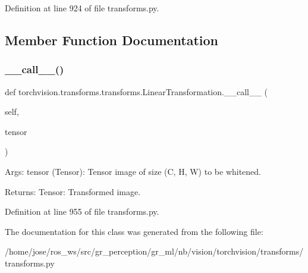 Definition at line 924 of file transforms.\+py.



\subsection{Member Function Documentation}
\mbox{\label{classtorchvision_1_1transforms_1_1transforms_1_1LinearTransformation_a9a29e7502fee078fcefed71fa7128657}} 
\subsubsection{\texorpdfstring{\+\_\+\+\_\+call\+\_\+\+\_\+()}{\_\_call\_\_()}}
{\footnotesize\ttfamily def torchvision.\+transforms.\+transforms.\+Linear\+Transformation.\+\_\+\+\_\+call\+\_\+\+\_\+ (\begin{DoxyParamCaption}\item[{}]{self,  }\item[{}]{tensor }\end{DoxyParamCaption})}

\begin{DoxyVerb}Args:
    tensor (Tensor): Tensor image of size (C, H, W) to be whitened.

Returns:
    Tensor: Transformed image.
\end{DoxyVerb}
 

Definition at line 955 of file transforms.\+py.



The documentation for this class was generated from the following file\+:\begin{DoxyCompactItemize}
\item 
/home/jose/ros\+\_\+ws/src/gr\+\_\+perception/gr\+\_\+ml/nb/vision/torchvision/transforms/transforms.\+py\end{DoxyCompactItemize}
